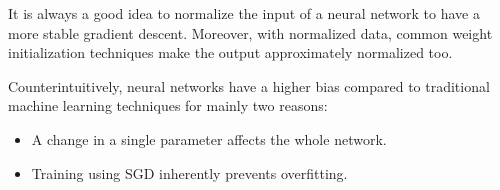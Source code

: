 \begin{remark}
    It is always a good idea to normalize the input of a neural network to have a more stable gradient descent. Moreover, with normalized data, common weight initialization techniques make the output approximately normalized too.
\end{remark}

\begin{remark}
    Counterintuitively, neural networks have a higher bias compared to traditional machine learning techniques for mainly two reasons:
    \begin{itemize}
        \item A change in a single parameter affects the whole network.
        \item Training using SGD inherently prevents overfitting. 
    \end{itemize}
\end{remark}


